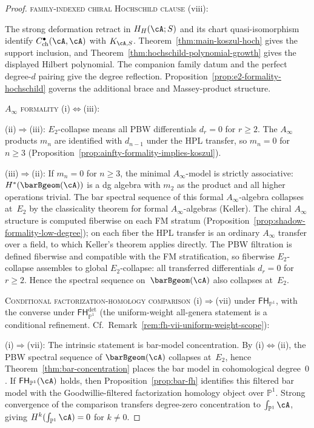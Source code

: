 \begin{proof}
\medskip
\textsc{family-indexed chiral Hochschild clause}
\textup{(viii)}:

\smallskip\noindent
The strong deformation retract in $H_H(\cA;S)$ and its chart
quasi-isomorphism identify
$C^\bullet_{\mathrm{ch}}(\cA,\cA)$ with $K_{\cA,S}$.
Theorem~\ref{thm:main-koszul-hoch} gives the support inclusion, and
Theorem~\ref{thm:hochschild-polynomial-growth} gives the displayed
Hilbert polynomial.  The companion family datum and the perfect
degree-$d$ pairing give the degree reflection.  Proposition~\ref{prop:e2-formality-hochschild}
governs the additional brace and Massey-product structure.

\medskip
\textsc{$A_\infty$ formality}
\textup{(i)}$\Leftrightarrow$\textup{(iii)}:

\smallskip\noindent
\textup{(ii)}$\Rightarrow$\textup{(iii)}:
$E_2$-collapse means all PBW differentials $d_r = 0$ for $r \geq 2$.
The $A_\infty$ products $m_n$ are identified with $d_{n-1}$ under
the HPL transfer, so $m_n = 0$ for $n \geq 3$
(Proposition~\ref{prop:ainfty-formality-implies-koszul}).

\smallskip\noindent
\textup{(iii)}$\Rightarrow$\textup{(ii)}:
If $m_n = 0$ for $n \geq 3$, the minimal $A_\infty$-model is
strictly associative: $H^*(\barBgeom(\cA))$ is a dg algebra with
$m_2$ as the product and all higher operations trivial. The
bar spectral sequence of this formal $A_\infty$-algebra collapses
at~$E_2$ by the classicality theorem for formal $A_\infty$-algebras
(Keller). The chiral $A_\infty$ structure is computed fiberwise on
each FM stratum (Proposition~\ref{prop:shadow-formality-low-degree});
on each fiber the HPL transfer is an ordinary $A_\infty$ transfer
over a field, to which Keller's theorem applies directly. The PBW
filtration is defined fiberwise and compatible with the FM
stratification, so fiberwise $E_2$-collapse assembles to global
$E_2$-collapse: all transferred differentials $d_r = 0$ for
$r \geq 2$. Hence the spectral sequence
on~$\barBgeom(\cA)$ also collapses at~$E_2$.

\medskip
\textsc{Conditional factorization-homology comparison}
\textup{(i)}$\Rightarrow$\textup{(vii)} under
$\mathsf{FH}_{\mathbb{P}^1}$, with the converse under
$\mathsf{FH}^{\mathrm{det}}_{\mathbb{P}^1}$
\textup{(}the uniform-weight all-genera statement is a conditional
refinement. Cf.\ Remark~\ref{rem:fh-vii-uniform-weight-scope}\textup{)}:

\smallskip\noindent
\textup{(i)}$\Rightarrow$\textup{(vii)}:
The intrinsic statement is bar-model concentration. By
\textup{(i)}$\Leftrightarrow$\textup{(ii)}, the PBW spectral
sequence of $\barBgeom(\cA)$ collapses at~$E_2$, hence
Theorem~\ref{thm:bar-concentration} places the bar model in
cohomological degree~$0$. If
$\mathsf{FH}_{\mathbb{P}^1}(\cA)$ holds, then
Proposition~\ref{prop:bar-fh} identifies this filtered bar model
with the Goodwillie-filtered factorization homology object over
$\mathbb{P}^1$. Strong convergence of the comparison transfers
degree-zero concentration to $\int_{\mathbb{P}^1}\cA$, giving
$H^k(\int_{\mathbb{P}^1}\cA)=0$ for $k \neq 0$.


\end{proof}
